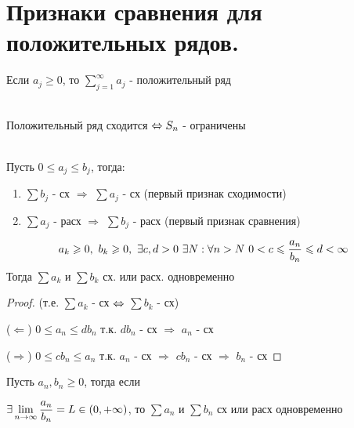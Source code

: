 \documentclass[matan]{subfiles}
\begin{document}
  \newpage
  \section{Признаки сравнения для положительных рядов.}

  \begin{definition}
      Если $a_j \geqslant 0$, то $\sum\limits_{j=1}^\infty a_j$ - положительный ряд
  \end{definition}

  \begin{theorem}\ \\
      Положительный ряд сходится $\Leftrightarrow S_n$ - ограничены
  \end{theorem}

  \begin{consequence} \ \\
      Пусть $0 \leqslant a_j \leqslant b_j$, тогда:
      \begin{enumerate}
          \item $\sum b_j$ - сх $\Rightarrow$ $\sum a_j$ - сх (первый признак сходимости)
          \item $\sum a_j$ - расх $\Rightarrow$ $\sum b_j$ - расх (первый признак сравнения)
      \end{enumerate}
  \end{consequence}

  \begin{Consequence}
      \[a_k \geqslant 0,\ b_k \geqslant 0,\ \exists c,d > 0\ \exists N: \forall n > N\ 0 < c \leqslant \frac{a_n}{b_n} \leqslant d < \infty\]
      Тогда $\sum a_k$ и $\sum b_k$ сх. или расх. одновременно
  \end{Consequence}

  \begin{proof}
      (т.е. $\sum a_k$ - сх $\Leftrightarrow$ $\sum b_k$ - сх)

      ($\Leftarrow$) $0 \leqslant a_n \leqslant d b_n$ т.к. $d b_n$ - сх $\Rightarrow$ $a_n$ - сх

      ($\Rightarrow$) $0 \leqslant c b_n \leqslant a_n$ т.к. $a_n$ - сх $\Rightarrow$ $c b_n$ - сх $\Rightarrow$ $b_n$ - сх
  \end{proof}

  \begin{consequence} 
      Пусть $a_n, b_n \geqslant 0$, тогда если

      $\exists \lim\limits_{n \rightarrow \infty} \dfrac{a_n}{b_n} = L \in (0, + \infty)$, то $\sum a_n$ и $\sum b_n$ сх или расх одновременно
  \end{consequence}
\end{document}
